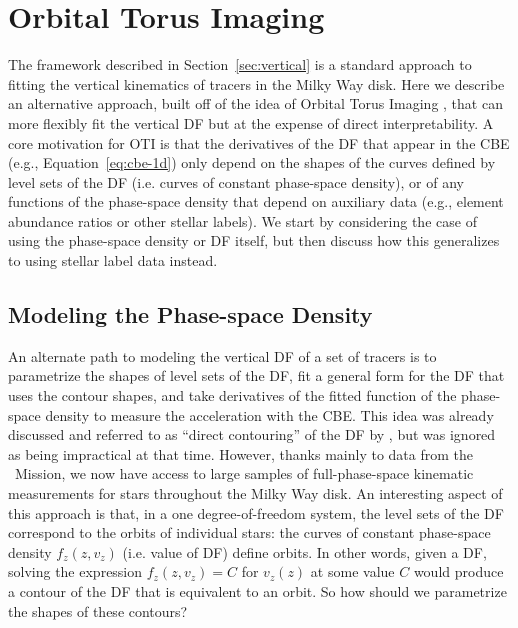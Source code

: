 \section{Orbital Torus Imaging} \label{sec:oti}


The framework described in Section~\ref{sec:vertical} is a standard approach to fitting
the vertical kinematics of tracers in the Milky Way disk.
Here we describe an alternative approach, built off of the idea of Orbital Torus Imaging
\citep[OTI;][]{Price-Whelan:2021}, that can more flexibly fit the vertical DF but at
the expense of direct interpretability.
A core motivation for OTI is that the derivatives of the DF that appear in the CBE
(e.g., Equation~\ref{eq:cbe-1d}) only depend on the shapes of the curves defined by
level sets of the DF (i.e. curves of constant phase-space density), or of any functions
of the phase-space density that depend on auxiliary data (e.g., element abundance ratios
or other stellar labels).
We start by considering the case of using the phase-space density or DF itself, but then
discuss how this generalizes to using stellar label data instead.

\subsection{Modeling the Phase-space Density} \label{sec:psd}

An alternate path to modeling the vertical DF of a set of tracers is to parametrize the
shapes of level sets of the DF, fit a general form for the DF that uses the contour
shapes, and take derivatives of the fitted function of the phase-space density to
measure the acceleration with the CBE.
This idea was already discussed and referred to as ``direct contouring'' of the DF by
\citet{Kuijken:XXXX}, but was ignored as being impractical at that time.
However, thanks mainly to data from the \gaia\ Mission, we now have access to large
samples of full-phase-space kinematic measurements for stars throughout the Milky Way
disk.
An interesting aspect of this approach is that, in a one degree-of-freedom system, the
level sets of the DF correspond to the orbits of individual stars:
the curves of constant phase-space density $f_z(z, v_z)$ (i.e. value of DF) define
orbits.
In other words, given a DF, solving the expression $f_z(z, v_z) = C$ for $v_z(z)$ at
some value $C$ would produce a contour of the DF that is equivalent to an orbit.
So how should we parametrize the shapes of these contours?

